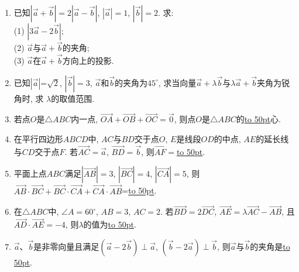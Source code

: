 \documentclass[10pt,a4paper]{article}
\newcommand{\blank}[1]{\underline{\hbox to #1pt{}}}
\begin{document}
\begin{enumerate}[1.]
\item 已知$|\overrightarrow a+\overrightarrow b|=2| \overrightarrow a-\overrightarrow b|$, $|\overrightarrow a|=1$, $|\overrightarrow b|=2$. 求:\\
(1) $|3\overrightarrow a-2\overrightarrow b|$;\\
(2) $\overrightarrow a$与$\overrightarrow a+\overrightarrow b$的夹角;\\
(3) $\overrightarrow a$在$\overrightarrow a+\overrightarrow b$方向上的投影.
\item 已知$|\overrightarrow{a}|$=$\sqrt 2$, $|\overrightarrow{b}|=3$, $\overrightarrow{a}$和$\overrightarrow{b}$的夹角为$45^\circ$, 求当向量$\overrightarrow{a}+\lambda \overrightarrow{b}$与$\lambda \overrightarrow{a}+\overrightarrow{b}$夹角为锐角时, 求 $\lambda$的取值范围.
\item 若点$O$是$\triangle ABC$内一点, $\overrightarrow{OA}+\overrightarrow{OB}+\overrightarrow{OC}=\overrightarrow 0$, 则点$O$是$\triangle ABC$的\blank{50}心.
\item 在平行四边形$ABCD$中, $AC$与$BD$交于点$O$, $E$是线段$OD$的中点, $AE$的延长线与$CD$交于点$F$. 若$\overrightarrow{AC}=\overrightarrow a$, $\overrightarrow{BD}=\overrightarrow b$, 则$\overrightarrow{AF}=$\blank{50}.
\begin{center}
\end{center}
\item 平面上点$ABC$满足$|\overrightarrow{AB}|=3$, $|\overrightarrow{BC}|=4$, $|\overrightarrow{CA}|=5$, 则$\overrightarrow{AB}\cdot \overrightarrow{BC}+\overrightarrow{BC}\cdot \overrightarrow{CA}+\overrightarrow{CA}\cdot \overrightarrow{AB}$=\blank{50}.
\item 在$\triangle ABC$中, $\angle A=60^\circ$, $AB=3$, $AC=2$. 若$\overrightarrow{BD}=2\overrightarrow{DC}$, $\overrightarrow{AE}=\lambda \overrightarrow{AC}-\overrightarrow{AB}$, 且$\overrightarrow{AD}\cdot \overrightarrow{AE}=-4$, 则$\lambda$的值为\blank{50}.
\item $\overrightarrow a$、$\overrightarrow b$是非零向量且满足$(\overrightarrow a-2\overrightarrow b)\perp \overrightarrow a$, $(\overrightarrow b-2\overrightarrow a)\perp \overrightarrow b$, 则$\overrightarrow a$与$\overrightarrow b$的夹角是\blank{50}.

\end{enumerate}
\end{document}
